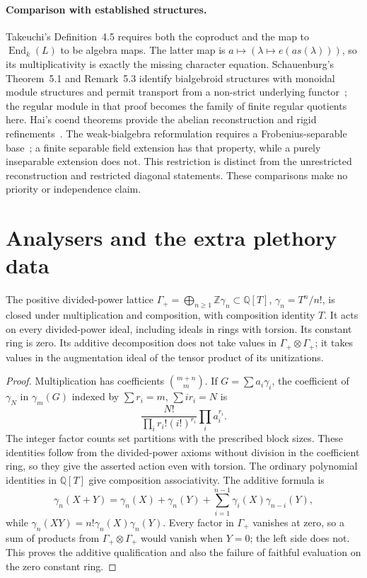 \paragraph{Comparison with established structures.}\label{par:qualified-tannaka-comparison}
Takeuchi's Definition~4.5 requires both the coproduct and the map
to $\operatorname{End}_k(L)$ to be algebra maps. The latter map is
$a\mapsto(\lambda\mapsto e(a s(\lambda)))$, so its multiplicativity
is exactly the missing character equation. Schauenburg's
Theorem~5.1 and Remark~5.3 identify bialgebroid structures with
monoidal module structures and permit transport from a non-strict
underlying functor~\cite{Schauenburg1998}; the regular module in
that proof becomes the family of finite regular quotients here.
Hai's coend theorems provide the abelian reconstruction and
rigid refinements~\cite[Theorems~2.1.2, 2.2.4, 2.2.6 and
Corollary~2.2.5]{Hai2008}. The weak-bialgebra reformulation requires
a Frobenius-separable base~\cite[Section~3 and Theorems~5.1, 5.5]{Schauenburg2003};
a finite separable field extension has that property, while a
purely inseparable extension does not. This restriction is distinct
from the unrestricted reconstruction and restricted diagonal
statements. These comparisons make no priority or independence claim.

\section{Analysers and the extra plethory data}

\begin{proposition}\label{prop:divided-power-analyser}
The positive divided-power lattice
$\Gamma_+=\bigoplus_{n\ge1}\mathbb Z\gamma_n\subset\mathbb Q[T]$,
$\gamma_n=T^n/n!$, is closed under multiplication and composition,
with composition identity $T$. It acts on every divided-power
ideal, including ideals in rings with torsion. Its constant ring
is zero. Its additive decomposition does not take values in
$\Gamma_+\otimes\Gamma_+$; it takes values in the augmentation
ideal of the tensor product of its unitizations.
\end{proposition}
\begin{proof}
Multiplication has coefficients $\binom{m+n}m$. If
$G=\sum a_i\gamma_i$, the coefficient of $\gamma_N$ in
$\gamma_m(G)$ indexed by $\sum r_i=m$, $\sum ir_i=N$ is
\[
                 \frac{N!}{\prod_i r_i!(i!)^{r_i}}
                              \prod_i a_i^{r_i}.
\]
The integer factor counts set partitions with the prescribed block
sizes. These identities follow from the divided-power axioms
without division in the coefficient ring, so they give the
asserted action even with torsion. The ordinary polynomial
identities in $\mathbb Q[T]$ give composition associativity.
The additive formula is
\[
 \gamma_n(X+Y)=\gamma_n(X)+\gamma_n(Y)
                    +\sum_{i=1}^{n-1}\gamma_i(X)\gamma_{n-i}(Y),
\]
while $\gamma_n(XY)=n!\gamma_n(X)\gamma_n(Y)$.
Every factor in $\Gamma_+$ vanishes at zero, so a sum of products
from $\Gamma_+\otimes\Gamma_+$ would vanish when $Y=0$; the
left side does not. This proves the additive qualification and
also the failure of faithful evaluation on the zero constant ring.
\end{proof}

